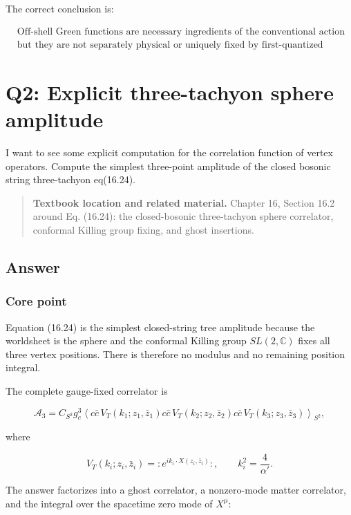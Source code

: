 \documentclass[
  10pt,
  a4paper,
  openany]{book}
\begin{document}
The correct conclusion is:

\[
\boxed{
\begin{aligned}
&\text{Off-shell Green functions are necessary ingredients of the conventional action formalism,}\\
&\text{but they are not separately physical or uniquely fixed by first-quantized string amplitudes.}
\end{aligned}
}
\]

\section{Q2: Explicit three-tachyon sphere
amplitude}\label{q2-explicit-three-tachyon-sphere-amplitude}

I want to see some explicit computation for the correlation function of
vertex operators. Compute the simplest three-point amplitude of the
closed bosonic string three-tachyon eq(16.24).

\begin{quote}
\textbf{Textbook location and related material.} Chapter 16, Section
16.2 around Eq. (16.24): the closed-bosonic three-tachyon sphere
correlator, conformal Killing group fixing, and ghost insertions.
\end{quote}

\subsection{Answer}\label{answer-31}

\subsubsection{Core point}\label{core-point-31}

Equation (16.24) is the simplest closed-string tree amplitude because
the worldsheet is the sphere and the conformal Killing group
\(SL(2,\mathbb C)\) fixes all three vertex positions. There is therefore
no modulus and no remaining position integral.

The complete gauge-fixed correlator is

\[
\mathcal A_3
=C_{S^2}g_c^3
\left\langle
c\bar c\,V_T(k_1;z_1,\bar z_1)
c\bar c\,V_T(k_2;z_2,\bar z_2)
c\bar c\,V_T(k_3;z_3,\bar z_3)
\right\rangle_{S^2},
\]

where

\[
V_T(k_i;z_i,\bar z_i)
=:e^{ik_i\cdot X(z_i,\bar z_i)}:,
\qquad
k_i^2=\frac{4}{\alpha'}.
\]

The answer factorizes into a ghost correlator, a nonzero-mode matter
correlator, and the integral over the spacetime zero mode of \(X^\mu\):
\end{document}

